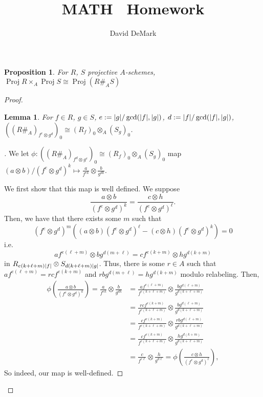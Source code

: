\documentclass[english,letter,doublesided]{article}
\title{MATH \course~Homework \Roman{hwn}}
\author{David DeMark}
\date{\due}
\DeclarePairedDelimiter\abs{\lvert}{\rvert}%
\newenvironment{subproof}[1][\proofname]{%
	\renewcommand{\qedsymbol}{$\blacksquare$}%
	\begin{proof}[#1]%
	}{%
	\end{proof}%
}
\newcommand{\prob}[1]{\setcounter{section}{#1-1}\section{}}
\newtheorem{lemma}[thm]{Lemma}
\newtheorem*{prop*}{Proposition}
\theoremstyle{remark}
\theoremstyle{definition}
\DeclareMathOperator{\proj}{Proj}
\begin{document}
\maketitle
	\prob{1}
	\prob{2}
	\prob{3}
	\begin{prop*} For $R$, $S$ projective $A$-schemes,
		$\proj R\times_A\proj S\cong \proj (R\#_A S)$
	\end{prop*} \begin{proof}
\begin{lemma} For $f\in R$, $g\in S$, $e:=\abs{g}/\gcd(\abs{f},\abs{g})$, $d:=\abs{f}/\gcd(\abs{f},\abs{g})$,
	$((R\#_A)_{f^e\otimes g^d})_0\cong (R_f)_0\otimes_A (S_g)_0$.
\end{lemma}
\begin{subproof}
	We let $\phi:((R\#_A)_{f^d\otimes g^e})_0\cong (R_f)_0\otimes_A (S_g)_0$ map $(a\otimes b)/(f^e\otimes g^d)^k\mapsto \frac{a}{f^{ek}}\otimes \frac{b}{g^{dk}}$.
	
	 We first show that this map is well defined. We suppose $$\frac{a\otimes b}{(f^e\otimes g^d)^k}=\frac{c\otimes h}{(f^e\otimes g^d)^\ell}.$$
	Then, we have that there exists some $m$ such that $$(f^e\otimes g^d)^m\left((a\otimes b)(f^e\otimes g^d)^\ell-(c\otimes h)(f^e\otimes g^d)^k\right)=0$$
	i.e. $$af^{e(\ell+m)}\otimes bg^{d(m+\ell)}=cf^{e(k+m)}\otimes hg^{d(k+m)}$$
	in $R_{e(k+\ell+m)\abs{f}}\otimes S_{d(k+\ell +m)\abs{g}}$. Thus, there is some $r\in A$ such that $af^{e(\ell+m)}=rcf^{e(k+m)}$ and $rbg^{d(m+\ell)}=hg^{d(k+m)}$ modulo relabeling. Then, \begin{align*}
	\phi\left(\frac{a\otimes b}{(f^e\otimes g^d)^k}\right)=\frac{a}{f^{ek}}\otimes \frac{b}{g^{dk}}&=\frac{af^{e(\ell+m)}}{f^{e(k+\ell+m)}}\otimes \frac{bg^{d(\ell+m)}}{g^{d(k+\ell+m)}}\\
		&=\frac{rcf^{e(k+m)}}{f^{e(k+\ell+m)}}\otimes \frac{bg^{d(\ell+m)}}{g^{d(k+\ell+m)}}\\
	&=\frac{cf^{e(k+m)}}{f^{e(k+\ell+m)}}\otimes \frac{rbg^{d(\ell+m)}}{g^{d(k+\ell+m)}}\\
	&=\frac{cf^{e(k+m)}}{f^{e(k+\ell+m)}}\otimes \frac{hg^{d(k+m)}}{g^{d(k+\ell+m)}}\\
	&=\frac{c}{f^{e\ell}}\otimes \frac{h}{g^{d\ell}}=\phi\left(\frac{c\otimes h}{(f^e\otimes g^d)^\ell}\right),
	\end{align*}
	So indeed, our map is well-defined.


\end{subproof}
\end{proof}
\end{document}
